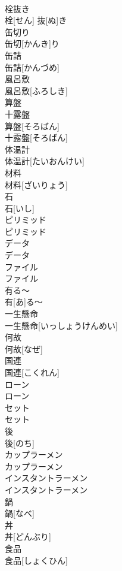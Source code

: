 \documentclass[8pt]{extreport}
\begin{document}
\begin{CJK}{UTF8}{min}
\\	栓抜き	
\\	栓[せん] 抜[ぬ]き	
\\	缶切り	
\\	缶切[かんき]り	
\\	缶詰	
\\	缶詰[かんづめ]	
\\	風呂敷	
\\	風呂敷[ふろしき]	
\\	算盤
\\	十露盤	
\\	算盤[そろばん]
\\	十露盤[そろばん]	
\\	体温計	
\\	体温計[たいおんけい]	
\\	材料	
\\	材料[ざいりょう]	
\\	石	
\\	石[いし]	
\\	ピリミッド	
\\	ピリミッド	
\\	データ	
\\	データ	
\\	ファイル	
\\	ファイル	
\\	有る〜	
\\	有[あ]る〜	
\\	一生懸命	
\\	一生懸命[いっしょうけんめい]	
\\	何故	
\\	何故[なぜ]	
\\	国連	
\\	国連[こくれん]	
\\	ローン	
\\	ローン	
\\	セット	
\\	セット	
\\	後	
\\	後[のち]	
\\	カップラーメン	
\\	カップラーメン	
\\	インスタントラーメン	
\\	インスタントラーメン	
\\	鍋	
\\	鍋[なべ]	
\\	丼	
\\	丼[どんぶり]	
\\	食品	
\\	食品[しょくひん]	

\end{CJK}
\end{document}
